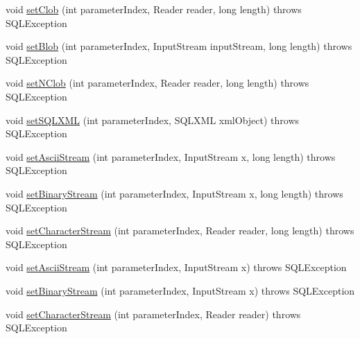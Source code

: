 \begin{DoxyCompactItemize}
\item 
void \mbox{\hyperlink{classcom_1_1mysql_1_1cj_1_1jdbc_1_1_prepared_statement_wrapper_ace3a608cba286f1254164b586fe87ec4}{set\+Clob}} (int parameter\+Index, Reader reader, long length)  throws S\+Q\+L\+Exception 
\item 
void \mbox{\hyperlink{classcom_1_1mysql_1_1cj_1_1jdbc_1_1_prepared_statement_wrapper_a9b6a332a9a9f4d7c2c72b7a012bb7a55}{set\+Blob}} (int parameter\+Index, Input\+Stream input\+Stream, long length)  throws S\+Q\+L\+Exception 
\item 
void \mbox{\hyperlink{classcom_1_1mysql_1_1cj_1_1jdbc_1_1_prepared_statement_wrapper_a36e3eabe36d5618c0640d7e7911acea0}{set\+N\+Clob}} (int parameter\+Index, Reader reader, long length)  throws S\+Q\+L\+Exception 
\item 
void \mbox{\hyperlink{classcom_1_1mysql_1_1cj_1_1jdbc_1_1_prepared_statement_wrapper_afba350036cb2360c61678b08add485ea}{set\+S\+Q\+L\+X\+ML}} (int parameter\+Index, S\+Q\+L\+X\+ML xml\+Object)  throws S\+Q\+L\+Exception 
\item 
void \mbox{\hyperlink{classcom_1_1mysql_1_1cj_1_1jdbc_1_1_prepared_statement_wrapper_afa25628f80a3f5c3ad48dad5db339b8a}{set\+Ascii\+Stream}} (int parameter\+Index, Input\+Stream x, long length)  throws S\+Q\+L\+Exception 
\item 
void \mbox{\hyperlink{classcom_1_1mysql_1_1cj_1_1jdbc_1_1_prepared_statement_wrapper_aa7a0fe6a418116388b6506b184071259}{set\+Binary\+Stream}} (int parameter\+Index, Input\+Stream x, long length)  throws S\+Q\+L\+Exception 
\item 
void \mbox{\hyperlink{classcom_1_1mysql_1_1cj_1_1jdbc_1_1_prepared_statement_wrapper_aa81065eaf24cabb1ae64a802f076d84f}{set\+Character\+Stream}} (int parameter\+Index, Reader reader, long length)  throws S\+Q\+L\+Exception 
\item 
void \mbox{\hyperlink{classcom_1_1mysql_1_1cj_1_1jdbc_1_1_prepared_statement_wrapper_aeeb5226fe8fa2075b38b1806cbf69674}{set\+Ascii\+Stream}} (int parameter\+Index, Input\+Stream x)  throws S\+Q\+L\+Exception 
\item 
void \mbox{\hyperlink{classcom_1_1mysql_1_1cj_1_1jdbc_1_1_prepared_statement_wrapper_a95adcf975e43aa8e7dc9561173570929}{set\+Binary\+Stream}} (int parameter\+Index, Input\+Stream x)  throws S\+Q\+L\+Exception 
\item 
void \mbox{\hyperlink{classcom_1_1mysql_1_1cj_1_1jdbc_1_1_prepared_statement_wrapper_a0544d24d9fec9e0843352d6f92459891}{set\+Character\+Stream}} (int parameter\+Index, Reader reader)  throws S\+Q\+L\+Exception 

\end{DoxyCompactItemize}
